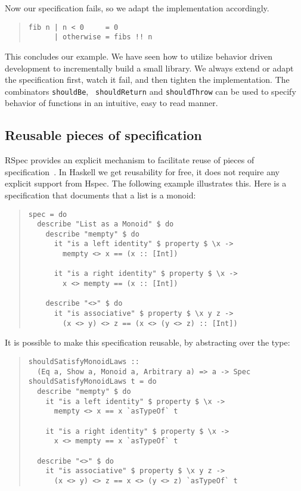 \documentclass[preprint]{sigplanconf}
\begin{document}
\noindent Now our specification fails, so we adapt the implementation
accordingly.

\begin{quote}
\small
\begin{verbatim}
fib n | n < 0     = 0
      | otherwise = fibs !! n
\end{verbatim}
\end{quote}

\noindent This concludes our example.  We have seen how to utilize
behavior driven development to incrementally build a small library.
We always extend or adapt the specification first, watch it fail,  and
then tighten the implementation.  The combinators {\tt shouldBe}, {\tt
shouldReturn} and {\tt shouldThrow} can be used to specify behavior of
functions in an intuitive, easy to read manner.

\subsection{Reusable pieces of specification}
\label{sec:reusable-specs}

RSpec provides an explicit mechanism to facilitate reuse of pieces of
specification~\cite{rspec}.
In Haskell we get reusability for free, it does not require any
explicit support from Hspec.
The following example illustrates this.
Here is a specification that documents that a list is a monoid:

\begin{quote}
\small
\begin{verbatim}
spec = do
  describe "List as a Monoid" $ do
    describe "mempty" $ do
      it "is a left identity" $ property $ \x ->
        mempty <> x == (x :: [Int])

      it "is a right identity" $ property $ \x ->
        x <> mempty == (x :: [Int])

    describe "<>" $ do
      it "is associative" $ property $ \x y z ->
        (x <> y) <> z == (x <> (y <> z) :: [Int])
\end{verbatim}
\end{quote}

\noindent It is possible to make this specification reusable, by
abstracting over the type:

\begin{quote}
\small
\begin{verbatim}
shouldSatisfyMonoidLaws ::
  (Eq a, Show a, Monoid a, Arbitrary a) => a -> Spec
shouldSatisfyMonoidLaws t = do
  describe "mempty" $ do
    it "is a left identity" $ property $ \x ->
      mempty <> x == x `asTypeOf` t

    it "is a right identity" $ property $ \x ->
      x <> mempty == x `asTypeOf` t

  describe "<>" $ do
    it "is associative" $ property $ \x y z ->
      (x <> y) <> z == x <> (y <> z) `asTypeOf` t
\end{verbatim}
\end{quote}
\end{document}
